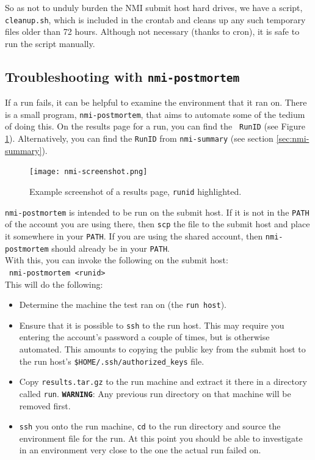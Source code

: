 So as not to unduly burden the NMI submit host hard drives, we have a script,
{\tt cleanup.sh}, which is included in the crontab and cleans up any such
temporary files older than 72 hours.  Although not necessary (thanks to cron),
it is safe to run the script manually.


\subsection{Troubleshooting with {\tt nmi-postmortem}}

If a run fails, it can be helpful to examine the environment that it ran on.
There is a small program, {\tt nmi-postmortem}, that aims to automate some of
the tedium of doing this.  On the results page for a run, you can find the {\tt
RunID} (see Figure \ref{fig:nmi:screenshot}).  Alternatively, you can find the
{\tt RunID} from {\tt nmi-summary} (see section \ref{sec:nmi-summary}).\\


\begin{figure}
	\texttt{[image: nmi-screenshot.png]}

	\caption{Example screenshot of a results page, {\tt runid} highlighted.}
	\label{fig:nmi:screenshot}
\end{figure}


{\tt nmi-postmortem} is intended to be run on the submit host.  If it is not in
the {\tt PATH} of the account you are using there, then {\tt scp} the file to
the submit host and place it somewhere in your {\tt PATH}.  If you are using the
shared account, then {\tt nmi-postmortem} should already be in your {\tt PATH}.\\


With this, you can invoke the following on the submit host:\\
\ {\tt nmi-postmortem <runid>}\\


This will do the following:
\begin{itemize}

	\item Determine the machine the test ran on (the {\tt run host}).

	\item Ensure that it is possible to {\tt ssh} to the run host.  This may
	require you entering the account's password a couple of times, but is
	otherwise automated.  This amounts to copying the public key from the submit
    host to the run host's {\tt \$HOME/.ssh/authorized\_keys} file.

	\item Copy {\tt results.tar.gz} to the run machine and extract it there in a
	directory called {\tt run}.  {\bf {\tt WARNING}}: Any previous run directory on
	that machine will be removed first.

	\item {\tt ssh} you onto the run machine, {\tt cd} to the run directory and
	source the environment file for the run.  At this point you should be able
	to investigate in an environment very close to the one the actual run failed
	on.
\end{itemize}

